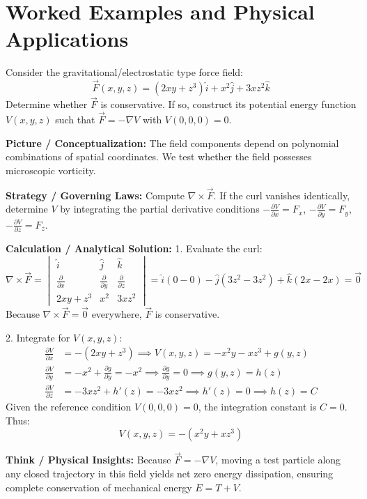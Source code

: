 \section{Worked Examples and Physical Applications}

\begin{psctexample}
Consider the gravitational/electrostatic type force field:
\begin{equation}
\vec{F}(x, y, z) = (2xy + z^3)\hat{i} + x^2\hat{j} + 3xz^2\hat{k}
\end{equation}
Determine whether $\vec{F}$ is conservative. If so, construct its potential energy function $V(x, y, z)$ such that $\vec{F} = -\nabla V$ with $V(0,0,0) = 0$.

\textbf{\color{rbruNavy}Picture / Conceptualization:}
The field components depend on polynomial combinations of spatial coordinates. We test whether the field possesses microscopic vorticity.

\textbf{\color{rbruNavy}Strategy / Governing Laws:}
Compute $\nabla \times \vec{F}$. If the curl vanishes identically, determine $V$ by integrating the partial derivative conditions $-\frac{\partial V}{\partial x} = F_x$, $-\frac{\partial V}{\partial y} = F_y$, $-\frac{\partial V}{\partial z} = F_z$.

\textbf{\color{rbruNavy}Calculation / Analytical Solution:}
1. Evaluate the curl:
\begin{equation}
\nabla \times \vec{F} = \begin{vmatrix} \hat{i} & \hat{j} & \hat{k} \\ \frac{\partial}{\partial x} & \frac{\partial}{\partial y} & \frac{\partial}{\partial z} \\ 2xy + z^3 & x^2 & 3xz^2 \end{vmatrix}
= \hat{i}(0 - 0) - \hat{j}(3z^2 - 3z^2) + \hat{k}(2x - 2x) = \vec{0}
\end{equation}
Because $\nabla \times \vec{F} = \vec{0}$ everywhere, $\vec{F}$ is conservative.

2. Integrate for $V(x, y, z)$:
\begin{align}
\frac{\partial V}{\partial x} &= -(2xy + z^3) \implies V(x, y, z) = -x^2 y - xz^3 + g(y, z) \\
\frac{\partial V}{\partial y} &= -x^2 + \frac{\partial g}{\partial y} = -x^2 \implies \frac{\partial g}{\partial y} = 0 \implies g(y, z) = h(z) \\
\frac{\partial V}{\partial z} &= -3xz^2 + h'(z) = -3xz^2 \implies h'(z) = 0 \implies h(z) = C
\end{align}
Given the reference condition $V(0,0,0) = 0$, the integration constant is $C = 0$.
Thus:
\begin{equation}
V(x, y, z) = -(x^2 y + xz^3)
\end{equation}

\textbf{\color{rbruNavy}Think / Physical Insights:}
Because $\vec{F} = -\nabla V$, moving a test particle along any closed trajectory in this field yields net zero energy dissipation, ensuring complete conservation of mechanical energy $E = T + V$.
\qedexam
\end{psctexample}

